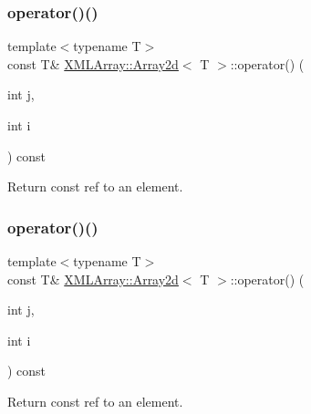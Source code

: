 \subsubsection{\texorpdfstring{operator()()}{operator()()}\hspace{0.1cm}{\footnotesize\ttfamily [4/6]}}
{\footnotesize\ttfamily template$<$typename T$>$ \\
const T\& \mbox{\hyperlink{classXMLArray_1_1Array2d}{X\+M\+L\+Array\+::\+Array2d}}$<$ T $>$\+::operator() (\begin{DoxyParamCaption}\item[{int}]{j,  }\item[{int}]{i }\end{DoxyParamCaption}) const\hspace{0.3cm}{\ttfamily [inline]}}



Return const ref to an element. 

\mbox{\label{classXMLArray_1_1Array2d_aa02dc8ee58bd33aca0cfbbf58cbf1ba7}} 
\subsubsection{\texorpdfstring{operator()()}{operator()()}\hspace{0.1cm}{\footnotesize\ttfamily [5/6]}}
{\footnotesize\ttfamily template$<$typename T$>$ \\
const T\& \mbox{\hyperlink{classXMLArray_1_1Array2d}{X\+M\+L\+Array\+::\+Array2d}}$<$ T $>$\+::operator() (\begin{DoxyParamCaption}\item[{int}]{j,  }\item[{int}]{i }\end{DoxyParamCaption}) const\hspace{0.3cm}{\ttfamily [inline]}}



Return const ref to an element. 

\mbox{\label{classXMLArray_1_1Array2d_aa02dc8ee58bd33aca0cfbbf58cbf1ba7}} 
